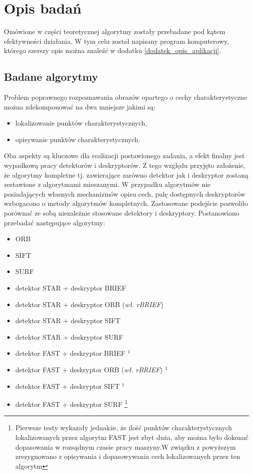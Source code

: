 \chapter{Opis badań}
Omówione w części teoretycznej algorytmy zostały przebadane pod kątem efektywności działania.
W tym celu został napisany program komputerowy, którego szerszy opis można znaleźć w dodatku \ref{dodatek_opis_aplikacji}.
\FloatBarrier 
\section{Badane algorytmy}
Problem poprawnego rozpoznawania obrazów opartego o cechy charakterystyczne można zdekomponować na dwa mniejsze jakimi są:
\begin{itemize}
\item lokalizowanie punktów charakterystycznych,
\item opisywanie punktów charakterystycznych.
\end{itemize}
Oba aspekty są kluczowe dla realizacji postawionego zadania, a efekt finalny jest wypadkową pracy detektorów i deskryptorów. Z tego względu przyjęto założenie, że algorytmy kompletne tj. zawierające zarówno detektor jak i deskryptor zostaną zestawione z algorytmami mieszanymi. W przypadku algorytmów nie posiadających własnych mechanizmów opisu cech, pulę dostępnych deskryptorów wzbogacono o metody algorytmów kompletnych. Zastosowane podejście pozwoliło porównać ze sobą niezależnie stosowane detektory i deskryptory.
Postanowiono przebadać następujące algorytmy:
\begin{itemize}
\item ORB
\item SIFT
\item SURF
\item detektor STAR + deskryptor BRIEF
\item detektor STAR + deskryptor ORB (\textit{wł. rBRIEF})
\item detektor STAR + deskryptor SIFT
\item detektor STAR + deskryptor SURF
\item detektor FAST + deskryptor BRIEF $^1$
\item detektor FAST + deskryptor ORB (\textit{wł. rBRIEF}) $^1$
\item detektor FAST + deskryptor SIFT $^1$
\item detektor FAST + deskryptor SURF \footnote{Pierwsze testy wykazały jednakże, że ilość punktów charakterystycznych lokalizowanych przez algorytm FAST jest zbyt duża, aby można było dokonać dopasowania w rozsądnym czasie pracy maszyny.W związku z powyższym zrezygnowano z opisywania i dopasowywania cech lokalizowanych przez ten algorytm}
\end{itemize}


